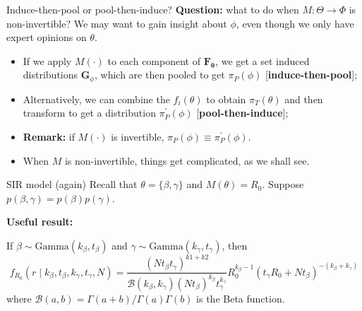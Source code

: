 \begin{frame}{Induce-then-pool or pool-then-induce?}
\textbf{Question:} what to do when $M : \Theta \to \Phi$ is non-invertible?
We may want to gain insight about $\phi$, even though we only have expert opinions on $\theta$.
\begin{itemize}
 \item[\ding{212}] If we apply $M(\cdot)$ to each component of $\mathbf{F_\theta}$, we get a set induced distributions $\boldsymbol G_\phi$, which are then pooled to get $\pi_P(\phi)$ [\textbf{induce-then-pool}];\pause
 \item[\ding{212}] Alternatively, we can combine the $f_i(\theta)$ to obtain $\pi_T(\theta)$ and then transform to get a distribution $\pi_P^\prime(\phi)$ [\textbf{pool-then-induce}];\pause
 \item \textbf{Remark:} if $M(\cdot)$ is invertible, $\pi_P(\phi) \equiv \pi_P^\prime(\phi)$. \pause
 \item When $M$ is non-invertible, things get complicated, as we shall see.
\end{itemize}
\end{frame}
\begin{frame}{SIR model (again)}
Recall that $\theta = \{\beta, \gamma \}$ and $M(\theta) = R_0$.
Suppose $p(\beta, \gamma) = p(\beta)p(\gamma)$.
\begin{center}
 \textbf{Useful result:}
\end{center}
If $\beta \sim \text{Gamma}(k_\beta, t_\beta)$ and $\gamma \sim \text{Gamma}(k_\gamma, t_\gamma)$, then 
\begin{equation*}
\label{eq:density}
f_{R_0}(r \mid k_{\beta}, t_{\beta},  k_{\gamma}, t_{\gamma}, N ) =  \frac{(Nt_{\beta}t_{\gamma})^{k1+k2}}{\mathcal{B}(k_{\beta}, k_{\gamma})(Nt_{\beta})^{k_{\beta}}t_{\gamma}^{k_{\gamma}} } R_0^{k_{\beta}-1} (t_{\gamma} R_0 + Nt_{\beta})^{-(k_{\beta} + k_{\gamma})}
\end{equation*}
where $\mathcal{B}(a, b) = \Gamma(a + b)/\Gamma(a)\Gamma(b)$ is the Beta function.
\end{frame}
